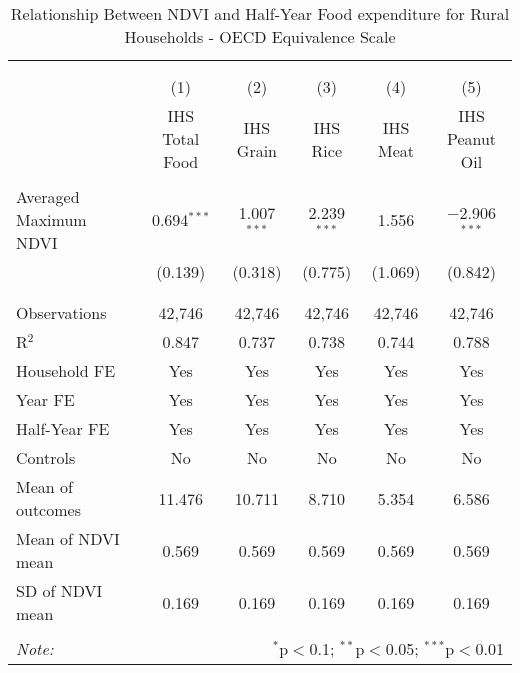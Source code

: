 
\begin{table}[!htbp] \centering 
  \caption{Relationship Between NDVI and Half-Year Food expenditure for Rural Households - OECD Equivalence Scale} 
  \label{ndvi_table_4_rural.tex} 
\normalsize 
\begin{tabular}{@{\extracolsep{5pt}}lccccc} 
\\[-1.8ex]\hline 
\hline \\[-1.8ex] 
\\[-1.8ex] & (1) & (2) & (3) & (4) & (5)\\ 
 & IHS Total Food & IHS Grain & IHS Rice & IHS Meat & IHS Peanut Oil \\ 
\hline \\[-1.8ex] 
 Averaged Maximum NDVI & 0.694$^{***}$ & 1.007$^{***}$ & 2.239$^{***}$ & 1.556 & $-$2.906$^{***}$ \\ 
  & (0.139) & (0.318) & (0.775) & (1.069) & (0.842) \\ 
  & & & & & \\ 
\hline \\[-1.8ex] 
Observations & 42,746 & 42,746 & 42,746 & 42,746 & 42,746 \\ 
R$^{2}$ & 0.847 & 0.737 & 0.738 & 0.744 & 0.788 \\ 
Household FE & Yes & Yes & Yes & Yes & Yes \\ 
Year FE & Yes & Yes & Yes & Yes & Yes \\ 
Half-Year FE & Yes & Yes & Yes & Yes & Yes \\ 
Controls & No & No & No & No & No \\ 
Mean of outcomes & 11.476 & 10.711 & 8.710 & 5.354 & 6.586 \\ 
Mean of NDVI mean & 0.569 & 0.569 & 0.569 & 0.569 & 0.569 \\ 
SD of NDVI mean & 0.169 & 0.169 & 0.169 & 0.169 & 0.169 \\ 
\hline \\[-1.8ex] 
\textit{Note:}  & \multicolumn{5}{r}{$^{*}$p$<$0.1; $^{**}$p$<$0.05; $^{***}$p$<$0.01} \\ 
\end{tabular} 
\end{table} 
